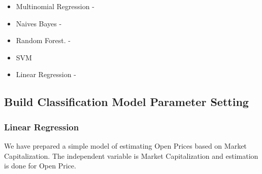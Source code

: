 \documentclass{article}
\begin{document}
\begin{itemize}
\item Multinomial Regression  -
\item Naives Bayes		      -
\item Random Forest.             -
\item SVM 		
\item Linear Regression              -
 \end{itemize}

\subsection {Build Classification Model Parameter Setting}

\subsubsection{Linear Regression}
We have prepared a simple model of estimating Open Prices based on Market Capitalization. The independent variable is Market Capitalization and estimation is done for Open Price.
\end{document}
